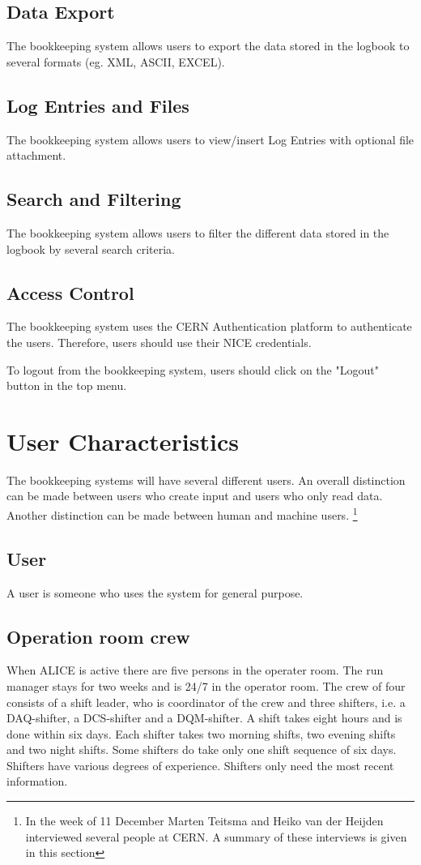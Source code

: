\subsection{Data Export}
The bookkeeping system allows users to export the data stored in the logbook to several formats (eg. XML, ASCII, EXCEL).
\subsection{Log Entries and Files}
The bookkeeping system allows users to view/insert Log Entries with optional file attachment.

\subsection{Search and Filtering}
The bookkeeping system allows users to filter the different data stored in the logbook by several search criteria.

\subsection{Access Control}
The bookkeeping system uses the CERN Authentication platform to authenticate the users. Therefore, users should use their NICE credentials.

To logout from the bookkeeping system, users should click on the "Logout" button in the top menu.



\section{User Characteristics}
The bookkeeping systems will have several different users. An overall distinction can be made between users who create input and users who only read data. Another distinction can be made between human and machine users. \footnote{In the week of 11 December Marten Teitsma and Heiko van der Heijden interviewed several people at CERN. A summary of these interviews is given in this section}

\subsection{User}
A user is someone who uses the system for general purpose.

\subsection{Operation room crew}
When ALICE is active there are five persons in the operater room. The run manager stays for two weeks and is 24/7 in the operator room. The crew of four consists of a shift leader, who is coordinator of the crew and three shifters, i.e. a DAQ-shifter, a DCS-shifter and a DQM-shifter. A shift takes eight hours and is done within six days. Each shifter takes two morning shifts, two evening shifts and two night shifts. Some shifters do take only one shift sequence of six days. Shifters have various degrees of experience. Shifters only need the most recent information. 

